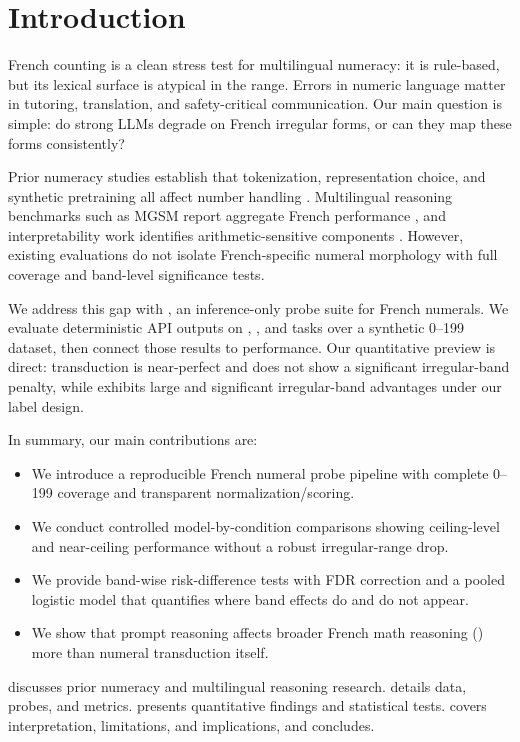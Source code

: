 \section{Introduction}
\label{sec:introduction}
French counting is a clean stress test for multilingual numeracy: it is rule-based, but its lexical surface is atypical in the \irregularband range. Errors in numeric language matter in tutoring, translation, and safety-critical communication. Our main question is simple: do strong LLMs degrade on French irregular forms, or can they map these forms consistently?

Prior numeracy studies establish that tokenization, representation choice, and synthetic pretraining all affect number handling \citep{wallace2019nlp,geva2020injecting,jin2021numgpt}. Multilingual reasoning benchmarks such as MGSM report aggregate French performance \citep{shi2022language}, and interpretability work identifies arithmetic-sensitive components \citep{yu2024interpreting,chang2024unraveling}. However, existing evaluations do not isolate French-specific numeral morphology with full coverage and band-level significance tests.

We address this gap with \frcountmap, an inference-only probe suite for French numerals. We evaluate deterministic API outputs on \digitword, \worddigit, and \patterncls tasks over a synthetic 0--199 dataset, then connect those results to \mgsmfr performance. Our quantitative preview is direct: transduction is near-perfect and does not show a significant irregular-band penalty, while \patterncls exhibits large and significant irregular-band advantages under our label design.

In summary, our main contributions are:
\begin{itemize}
    \item We introduce a reproducible French numeral probe pipeline with complete 0--199 coverage and transparent normalization/scoring.
    \item We conduct controlled model-by-condition comparisons showing ceiling-level \worddigit and near-ceiling \digitword performance without a robust irregular-range drop.
    \item We provide band-wise risk-difference tests with FDR correction and a pooled logistic model that quantifies where band effects do and do not appear.
    \item We show that prompt reasoning affects broader French math reasoning (\mgsmfr) more than numeral transduction itself.
\end{itemize}

  discusses prior numeracy and multilingual reasoning research.  details data, probes, and metrics.  presents quantitative findings and statistical tests.  covers interpretation, limitations, and implications, and  concludes.
